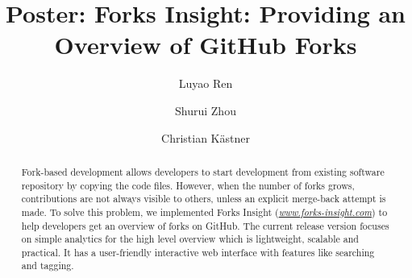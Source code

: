 \documentclass[sigconf]{acmart}
\begin{document}
\title{Poster: Forks Insight: Providing an Overview of GitHub Forks}

	\author{Luyao Ren}

	\author{Shurui Zhou}
	
	\author{Christian K\"{a}stner} 

	\iffalse
       \author{Andrzej W\k{a}sowski}
	\affiliation{%
		\institution{IT University of Copenhagen}
	}
	\fi


	\renewcommand{\shortauthors}{L. Ren et al.}
	

\begin{abstract}
Fork-based development allows developers to start development from existing software repository by copying the code files. However, when the number of forks grows, contributions are not always visible to others, unless an explicit merge-back attempt is made. To solve this problem, we implemented Forks Insight (\emph{\url{www.forks-insight.com}}) to help developers get an overview of forks on GitHub. The current release version focuses on simple analytics for the high level overview which is lightweight, scalable and practical. It has a user-friendly interactive web interface with features like searching and tagging.

\end{abstract}



\maketitle



 
\end{document}
